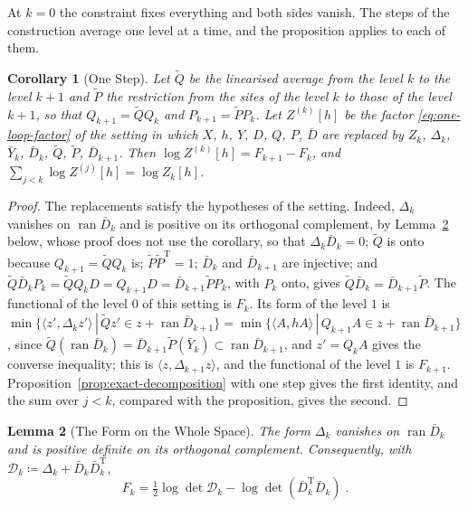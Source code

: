 \documentclass[11pt]{preprint}
\numberwithin{equation}{section}
\newtheorem{lemma}{Lemma}[section]
\newtheorem{corollary}[lemma]{Corollary}
\theoremstyle{definition}
\theoremstyle{remark}
\theoremstyle{plain}
\begin{document}
At $k = 0$ the constraint fixes everything and both sides vanish. The steps of the construction average one level at a time, and the proposition applies to each of them.

\begin{corollary}[One Step]\label{cor:one-step}
Let $\tilde Q$ be the linearised average from the level $k$ to the level $k + 1$ and $\tilde P$ the restriction from the sites of the level $k$ to those of the level $k + 1$, so that $Q_{k+1} = \tilde QQ_k$ and $P_{k+1} = \tilde PP_k$. Let $Z^{(k)}[h]$ be the factor \eqref{eq:one-loop-factor} of the setting in which $X$, $h$, $Y$, $D$, $Q$, $P$, $\bar D$ are replaced by $Z_k$, $\Delta_k$, $\bar Y_k$, $\bar D_k$, $\tilde Q$, $\tilde P$, $\bar D_{k+1}$. Then $\log Z^{(k)}[h] = F_{k+1} - F_k$, and $\sum_{j<k}\log Z^{(j)}[h] = \log Z_k[h]$.
\end{corollary}

\begin{proof}
The replacements satisfy the hypotheses of the setting. Indeed, $\Delta_k$ vanishes on $\operatorname{ran}\bar D_k$ and is positive on its orthogonal complement, by Lemma~\ref{lem:full-space-form} below, whose proof does not use the corollary, so that $\Delta_k\bar D_k = 0$; $\tilde Q$ is onto because $Q_{k+1} = \tilde QQ_k$ is; $\tilde P\tilde P^{\mathrm T} = 1$; $\bar D_k$ and $\bar D_{k+1}$ are injective; and $\tilde Q\bar D_kP_k = \tilde QQ_kD = Q_{k+1}D = \bar D_{k+1}\tilde PP_k$, with $P_k$ onto, gives $\tilde Q\bar D_k = \bar D_{k+1}\tilde P$. The functional of the level $0$ of this setting is $F_k$. Its form of the level $1$ is $\min\{ \langle z', \Delta_kz' \rangle \, | \, \tilde Qz' \in z + \operatorname{ran}\bar D_{k+1} \} = \min\{ \langle A, hA \rangle \, | \, Q_{k+1}A \in z + \operatorname{ran}\bar D_{k+1} \}$, since $\tilde Q(\operatorname{ran}\bar D_k) = \bar D_{k+1}\tilde P(\bar Y_k) \subset \operatorname{ran}\bar D_{k+1}$, and $z' = Q_kA$ gives the converse inequality; this is $\langle z, \Delta_{k+1}z \rangle$, and the functional of the level $1$ is $F_{k+1}$. Proposition~\ref{prop:exact-decomposition} with one step gives the first identity, and the sum over $j < k$, compared with the proposition, gives the second.
\end{proof}

\begin{lemma}[The Form on the Whole Space]\label{lem:full-space-form}
The form $\Delta_k$ vanishes on $\operatorname{ran}\bar D_k$ and is positive definite on its orthogonal complement. Consequently, with $\mathcal D_k \coloneqq \Delta_k + \bar D_k\bar D_k^{\mathrm T}$,
\begin{equation}\label{eq:level-functional-full}
    F_k = \tfrac12\log\det\mathcal D_k - \log\det(\bar D_k^{\mathrm T}\bar D_k)\;.
\end{equation}
\end{lemma}
\end{document}
